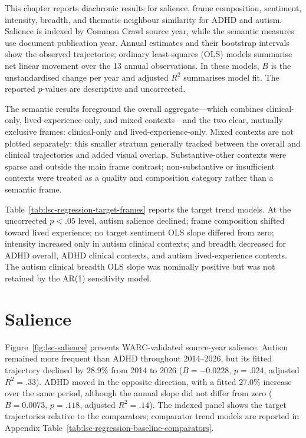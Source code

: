 This chapter reports diachronic results for salience, frame composition, sentiment, intensity, breadth, and thematic neighbour similarity for ADHD and autism. Salience is indexed by Common Crawl source year, while the semantic measures use document publication year. Annual estimates and their bootstrap intervals show the observed trajectories; ordinary least-squares (OLS) models summarise net linear movement over the 13 annual observations. In these models, $B$ is the unstandardised change per year and adjusted $R^2$ summarises model fit. The reported $p$-values are descriptive and uncorrected.

The semantic results foreground the overall aggregate---which combines clinical-only, lived-experience-only, and mixed contexts---and the two clear, mutually exclusive frames: clinical-only and lived-experience-only. Mixed contexts are not plotted separately: this smaller stratum generally tracked between the overall and clinical trajectories and added visual overlap. Substantive-other contexts were sparse and outside the main frame contrast; non-substantive or insufficient contexts were treated as a quality and composition category rather than a semantic frame.

Table~\ref{tab:lsc-regression-target-frames} reports the target trend models. At the uncorrected $p<.05$ level, autism salience declined; frame composition shifted toward lived experience; no target sentiment OLS slope differed from zero; intensity increased only in autism clinical contexts; and breadth decreased for ADHD overall, ADHD clinical contexts, and autism lived-experience contexts. The autism clinical breadth OLS slope was nominally positive but was not retained by the AR(1) sensitivity model.


\FloatBarrier

\section{Salience}

Figure~\ref{fig:lsc-salience} presents WARC-validated source-year salience. Autism remained more frequent than ADHD throughout 2014--2026, but its fitted trajectory declined by 28.9\% from 2014 to 2026 ($B=-0.0228$, $p=.024$, adjusted $R^2=.33$). ADHD moved in the opposite direction, with a fitted 27.0\% increase over the same period, although the annual slope did not differ from zero ($B=0.0073$, $p=.118$, adjusted $R^2=.14$). The indexed panel shows the target trajectories relative to the comparators; comparator trend models are reported in Appendix Table~\ref{tab:lsc-regression-baseline-comparators}.

